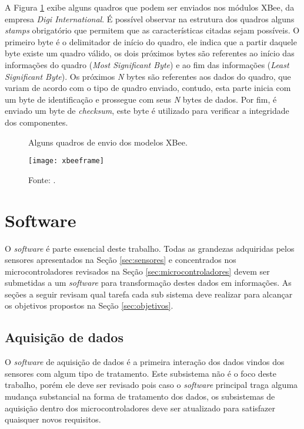 A Figura \ref{fig:xbeeframe} exibe alguns quadros que podem ser enviados nos módulos XBee, da empresa \textit{Digi International}. É possível observar na estrutura dos quadros alguns \textit{stamps} obrigatório que permitem que as características citadas sejam possíveis. O primeiro byte é o delimitador de início do quadro, ele indica que a partir daquele byte existe um quadro válido, os dois próximos bytes são referentes ao início das informações do quadro (\textit{Most Significant Byte}) e ao fim das informações (\textit{Least Significant Byte}). Os próximos \textit{N} bytes são referentes aos dados do quadro, que variam de acordo com o tipo de quadro enviado, contudo, esta parte inicia com um byte de identificação e prossegue com seus \textit{N} bytes de dados. Por fim, é enviado um byte de \textit{checksum}, este byte é utilizado para verificar a integridade dos componentes\cite{xbeetutorial}.       

\begin{figure}[!htb]
	\centering
		\caption{Alguns quadros de envio dos modelos XBee.}
		\texttt{[image: xbeeframe]} 
		\caption*{Fonte: \cite{xbeetutorial}.}
		\label{fig:xbeeframe}
\end{figure} 


\section{Software}
\label{sec:software}

O \textit{software} é parte essencial deste trabalho. Todas as grandezas adquiridas pelos sensores apresentados na Seção \ref{sec:sensores} e concentrados nos microcontroladores revisados na Seção \ref{sec:microcontroladores} devem ser submetidas a um \textit{software} para transformação destes dados em informações. As seções a seguir revisam qual tarefa cada sub sistema deve realizar para alcançar os objetivos propostos na Seção \ref{sec:objetivos}.  

\subsection{Aquisição de dados}
\label{sec:aquisicaodedados}

O \textit{software} de aquisição de dados é a primeira interação dos dados vindos dos sensores com algum tipo de tratamento. Este subsistema não é o foco deste trabalho, porém ele deve ser revisado pois caso o \textit{software} principal traga alguma mudança substancial na forma de tratamento dos dados, os subsistemas de aquisição dentro dos microcontroladores deve ser atualizado para satisfazer quaisquer novos requisitos.

